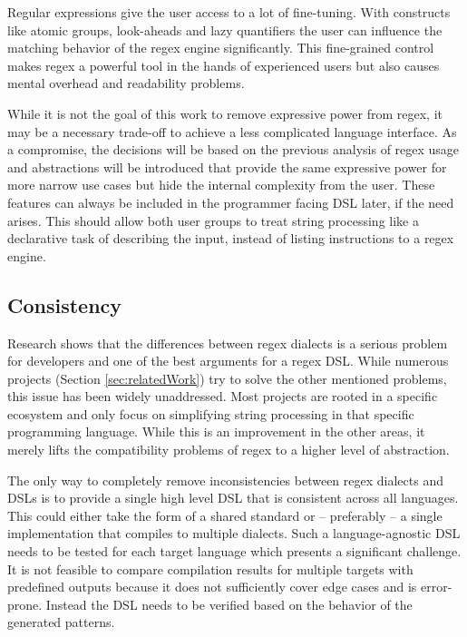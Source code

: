 Regular expressions give the user access to a lot of fine-tuning. With constructs like atomic groups, look-aheads and lazy quantifiers the user can influence the matching behavior of the regex engine significantly. This fine-grained control makes regex a powerful tool in the hands of experienced users but also causes mental overhead and readability problems. 

While it is not the goal of this work to remove expressive power from regex, it may be a necessary trade-off to achieve a less complicated language interface. As a compromise, the decisions will be based on the previous analysis of regex usage and abstractions will be introduced that provide the same expressive power for more narrow use cases but hide the internal complexity from the user. These features can always be included in the programmer facing DSL later, if the need arises. This should allow both user groups to treat string processing like a declarative task of describing the input, instead of listing instructions to a regex engine.

\subsection{Consistency}

Research shows that the differences between regex dialects is a serious problem for developers \cite{RegexNotLinguaFranca} and one of the best arguments for a regex DSL. While numerous projects (Section \ref{sec:relatedWork}) try to solve the other mentioned problems, this issue has been widely unaddressed.
Most projects are rooted in a specific ecosystem and only focus on simplifying string processing in that specific programming language. While this is an improvement in the other areas, it merely lifts the compatibility problems of regex to a higher level of abstraction.

The only way to completely remove inconsistencies between regex dialects and DSLs is to provide a single high level DSL that is consistent across all languages. This could either take the form of a shared standard or -- preferably -- a single implementation that compiles to multiple dialects. Such a language-agnostic DSL needs to be tested for each target language which presents a significant challenge. 
It is not feasible to compare compilation results for multiple targets with predefined outputs because it does not sufficiently cover edge cases and is error-prone. Instead the DSL needs to be verified based on the behavior of the generated patterns.

